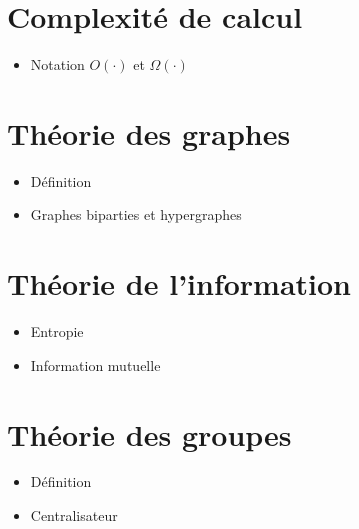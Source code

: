 \begin{comment}
\end{comment}

\appendix

\chapter{Complexité de calcul}
\label{chap:complexite_calcul}

\begin{itemize}
  \item Notation $O(\cdot)$ et $\Omega(\cdot)$
\end{itemize}

\chapter{Théorie des graphes}
\label{chap:theo_graphe}

\begin{itemize}
  \item Définition
  \item Graphes biparties et hypergraphes
\end{itemize}

\chapter{Théorie de l'information}
\label{chap:theo_info}

\begin{itemize}
  \item Entropie
  \item Information mutuelle
\end{itemize}

\chapter{Théorie des groupes}
\label{chap:theo_groupes}


\begin{itemize}
  \item Définition
  \item Centralisateur
\end{itemize}


